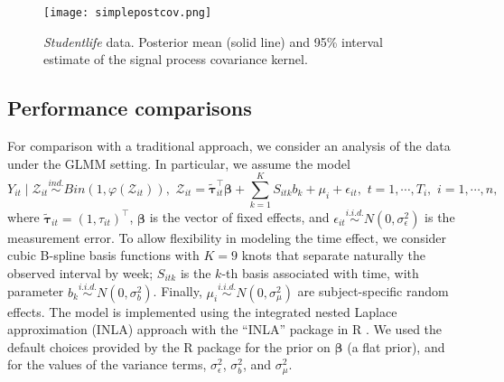 \begin{figure}[t!]
\centering
\texttt{[image: simplepostcov.png]}
\caption{\textit{Studentlife} data. Posterior mean (solid line) and 95\% interval 
estimate of the signal process covariance kernel. }
\label{fig:valarocov}
\end{figure}



\subsection{Performance comparisons}
\label{subsec:comparerealapp}

For comparison with a traditional approach, we consider an analysis of the data under
the GLMM setting. In particular, we assume the model
\begin{equation*}
		Y_{it}\mid \mathcal{Z}_{it} \stackrel{ind.}{\sim} Bin(1,\varphi(\mathcal{Z}_{it})), \,\,
		\mathcal{Z}_{it}=\tilde{\boldsymbol{\tau}}_{it}^{\top}\boldsymbol{\beta}+\sum_{k=1}^KS_{itk}b_{k}+\mu_i+\epsilon_{it},\,\, 
		t=1,\cdots,T_i, \,\, i=1,\cdots, n,
\end{equation*}  
where $\tilde{\boldsymbol{\tau}}_{it}=(1,\tau_{it})^{\top}$, $\boldsymbol{\beta}$ is the 
vector of fixed effects, and $\epsilon_{it}\stackrel{i.i.d.}{\sim}N(0,\sigma^2_{\epsilon})$ 
is the measurement error. To allow flexibility in modeling the time effect, we consider 
cubic B-spline basis functions with $K=9$ knots that separate naturally the observed interval
by week; $S_{itk}$ is the $k$-th basis associated with time, with parameter 
$b_k\stackrel{i.i.d.}{\sim}N(0,\sigma^2_b)$. Finally, $\mu_i\stackrel{i.i.d.}{\sim}N(0,\sigma_{\mu}^2)$ 
are subject-specific random effects. The model is implemented using the integrated nested Laplace 
approximation (INLA) approach \citep{Rue2009} with the ``INLA'' package in R \citep{Rue2017}. 
We used the default choices provided by the R package for the prior on $\boldsymbol{\beta}$
(a flat prior), and for the values of the variance terms, $\sigma^2_{\epsilon}$, $\sigma^2_{b}$, 
and $\sigma^2_{\mu}$.


